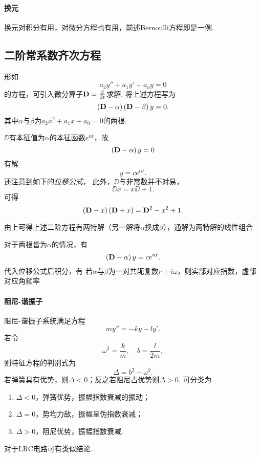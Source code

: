 \documentclass[UTF-8]{ctexart}
\begin{document}
  \paragraph{换元}换元对积分有用，对微分方程也有用，前述Bernoulli方程即是一例.
  \subsection{二阶常系数齐次方程}
  形如
  \[ a_2 y'' + a_1 y' + a_o y = 0 \]
  的方程，可引入微分算子$\mathbf{D} = \frac{\mathrm{d}}{\mathrm{d} t}{}$求解. 将上述方程写为
  \[ \left(\mathbf{D}-\alpha\right)\left(\mathbf{D}-\beta\right)y = 0. \]
  其中$\alpha$与$\beta$为$a_2 x^2 + a_1 x + a_0 = 0$的两根.
  \par
  $\DD$有本征值为$\alpha$的本征函数$e^{\alpha t}$，故
  \[ \left(\mathbf{D}-\alpha\right)y=0 \]
  有解
  \[ y=ce^{\alpha t}. \]
  还注意到如下的\emph{位移公式}，
  此外，$\DD$与非常数并不对易，
  \[ \DD x = x\DD + 1. \]
  可得
  \begin{equation}
    \label{eq:dpmx}
    \left(\mathbf{D}-x\right)\left(\mathbf{D}+x\right) = \mathbf{D}^2-x^2+1.
  \end{equation}
  \par
  由上可得上述二阶方程有两特解（另一解将$\alpha$换成$\beta$），通解为两特解的线性组合
  \par
  对于两根皆为$\alpha$的情况，有
  \[ \left(\mathbf{D}-\alpha\right)y = ce^{\alpha t}. \]
  代入位移公式后积分，有
  若$\alpha$与$\beta$为一对共轭复数$r \pm i\omega$，则实部对应指数，虚部对应角频率
  \paragraph{阻尼-谐振子}阻尼-谐振子系统满足方程
  \label{par:hd}
  \[ my''=-ky-ly'. \]
  若令
  \[ \omega^2 = \frac{k}{m}, \quad b = \frac{l}{2m}, \]
  则特征方程的判别式为
  \[ \Delta = b^2 - \omega^2. \]
  若弹簧具有优势，则$\Delta < 0$；反之若阻尼占优势则$\Delta > 0$. 可分类为
  \begin{enumerate}
    \item $\Delta < 0$，弹簧优势，振幅指数衰减的振动；
    \item $\Delta = 0$，势均力敌，振幅呈伪指数衰减；
    \item $\Delta > 0$，阻尼优势，振幅指数衰减.
  \end{enumerate}
  对于LRC电路可有类似结论.
\end{document}
